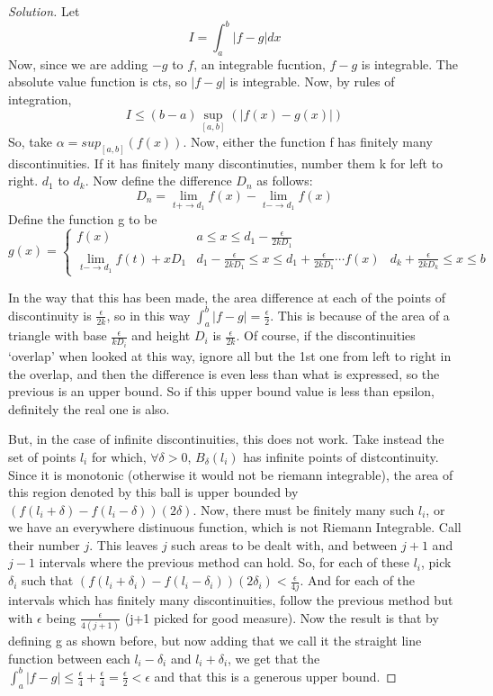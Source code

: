 \documentclass{article}
\newenvironment{problem}[2][Problem]{\begin{trivlist}
\item[\hskip \labelsep {\bfseries #1}\hskip \labelsep {\bfseries #2.}]}{\end{trivlist}}
\newenvironment{solution}{\begin{proof}[Solution]}{\end{proof}}
\begin{document}
\begin{solution}
	Let \[
		I = \int_{a}^{b}|f-g|dx
	\]
Now, since we are adding $-g$ to $f$, an integrable fucntion, $f-g$ is integrable. The absolute value function is cts, so $|f-g|$ is integrable. Now, by rules of integration, \[
	I \leq (b-a)\sup_{[a,b]}(|f(x)-g(x)|)
\]
So, take $\alpha = sup_{[a,b]}(f(x))$. Now, either the function f has finitely many discontinuities. If it has finitely many discontinuties, number them k for left to right. $d_{1}$ to $d_{k}$. Now define the difference $D_n$ as follows:
\[
	D_n = \lim_{t+ \to d_1}f(x)-\lim_{t- \to d_1}f(x)
\]
Define the function g to be
\[ g(x) = 
   \begin{cases} 
	f(x) & a \leq x \leq d_1 -\frac{\epsilon}{2kD_1} \\
	\lim_{t- \to d_1}f(t) +xD_1 & d_1 - \frac{\epsilon}{2kD_1} \leq x \leq d_1 + \frac{\epsilon}{2kD_1}
	\cdots
	f(x) & d_k + \frac{\epsilon}{2kD_{k}} \leq x \leq b 
   \end{cases}
\]

In the way that this has been made, the area difference at each of the points of discontinuity is $\frac{\epsilon}{2k}$, so in this way $\int_{a}^{b}|f-g| = \frac{\epsilon}{2}$. This is because of the area of a triangle with base $\frac{\epsilon}{kD_{i}}$ and height $D_{i}$ is $\frac{\epsilon}{2k}$.  Of course, if the discontinuities `overlap' when looked at this way, ignore all but the 1st one from left to right in the overlap, and then the difference is even less than what is expressed, so the previous is an upper bound. So if this upper bound value is less than epsilon, definitely the real one is also. 

But, in the case of infinite discontinuities, this does not work. Take instead the set of points $l_{i}$ for which, $\forall \delta > 0$, $B_{\delta}(l_{i})$ has infinite points of distcontinuity. Since it is monotonic (otherwise it would not be riemann integrable), the area of this region denoted by this ball is upper bounded by $(f(l_{i}+\delta) - f(l_{i}- \delta))(2\delta)$. Now, there must be finitely many such $l_{i}$, or we have an everywhere distinuous function, which is not Riemann Integrable. Call their number $j$. This leaves $j$ such areas to be dealt with, and between $j+1$ and $j-1$ intervals where the previous method can hold. So, for each of these $l_{i}$, pick $\delta_{i}$ such that $(f(l_{i}+\delta_{i}) - f(l_{i}- \delta_{i}))(2\delta_{i})<\frac{\epsilon}{4j}$. And for each of the intervals which has finitely many discontinuities, follow the previous method but with $\epsilon$ being $\frac{\epsilon}{4(j+1)}$ (j+1 picked for good measure). Now the result is that by defining g as shown before, but now adding that we call it the straight line function between each $l_{i}- \delta_{i}$ and $l_{i}+\delta_{i}$, we get that the $\int_{a}^{b}|f-g| \leq \frac{\epsilon}{4} +\frac{\epsilon}{4} = \frac{\epsilon}{2}<\epsilon$ and that this is a generous upper bound.


\end{solution}
\newpage
\begin{problem}{4}
\end{problem}
\end{document}
